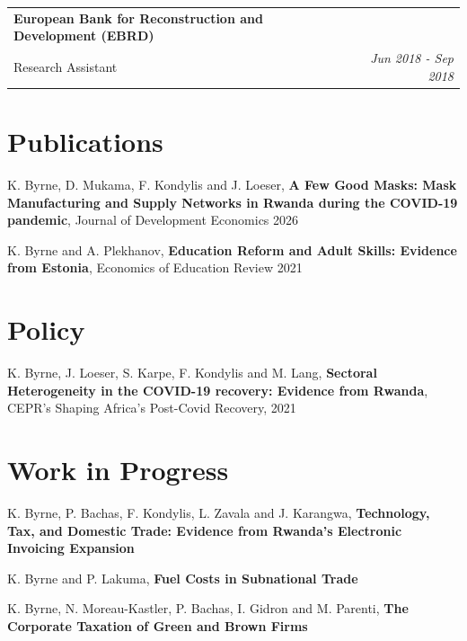 \documentclass[letterpaper,10.9pt, roman]{article}
\makeatletter
\newcommand{\resumeSubheading}[4]{
  \vspace{-2pt}
    \begin{tabular*}{0.97\textwidth}{l@{\extracolsep{\fill}}r}
      \textbf{#1} & #2 \\
      \medskip\small#3 & \small #4 \\
    \end{tabular*}\vspace{-5pt}
}
\newcommand{\resumeSubHeadingListEnd}{}
\makeatother
\begin{document}
\medskip
\resumeSubheading
{European Bank for Reconstruction and Development (EBRD)}{}
{Research Assistant }{\textit{Jun 2018 - Sep 2018}}\vspace{-3pt}

\resumeSubHeadingListEnd
    


\section{Publications} 
{K. Byrne, D. Mukama, F. Kondylis and J. Loeser, \textbf{A Few Good Masks: Mask Manufacturing and Supply Networks in Rwanda during the COVID-19 pandemic}, Journal of Development Economics 2026 }\\ \medskip

{K. Byrne and A. Plekhanov, 
	\textbf{Education Reform and Adult Skills: Evidence from Estonia}, Economics of Education Review 2021} \\

\section{Policy}
{K. Byrne, J. Loeser, S. Karpe, F. Kondylis and M. Lang, \textbf{Sectoral Heterogeneity in the COVID-19 recovery: Evidence from Rwanda}, CEPR's Shaping Africa's Post-Covid Recovery, 2021  }\\ \medskip

\section{Work in Progress}
{K. Byrne, P. Bachas, F. Kondylis, L. Zavala and J. Karangwa, \textbf{Technology, Tax, and Domestic Trade: Evidence from Rwanda’s Electronic Invoicing Expansion}}\\ \medskip

{K. Byrne and P. Lakuma, \textbf{Fuel Costs in Subnational Trade}}\\ \medskip

{K. Byrne, N. Moreau-Kastler, P. Bachas, I. Gidron and M. Parenti, \textbf{The Corporate Taxation of Green and Brown Firms}}\\ \medskip
\end{document}
